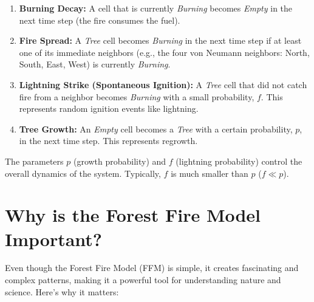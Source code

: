 \documentclass{article}
\begin{document}
\begin{enumerate}
    \item \textbf{Burning Decay:} A cell that is currently \emph{Burning} becomes \emph{Empty} in the next time step (the fire consumes the fuel).
    \item \textbf{Fire Spread:} A \emph{Tree} cell becomes \emph{Burning} in the next time step if at least one of its immediate neighbors (e.g., the four von Neumann neighbors: North, South, East, West) is currently \emph{Burning}.
    \item \textbf{Lightning Strike (Spontaneous Ignition):} A \emph{Tree} cell that did not catch fire from a neighbor becomes \emph{Burning} with a small probability, $f$. This represents random ignition events like lightning.
    \item \textbf{Tree Growth:} An \emph{Empty} cell becomes a \emph{Tree} with a certain probability, $p$, in the next time step. This represents regrowth.
\end{enumerate}

The parameters $p$ (growth probability) and $f$ (lightning probability) control the overall dynamics of the system. Typically, $f$ is much smaller than $p$ ($f \ll p$).


\section{Why is the Forest Fire Model Important?}

Even though the Forest Fire Model (FFM) is simple, it creates fascinating and complex patterns, making it a powerful tool for understanding nature and science. Here’s why it matters:
\end{document}
